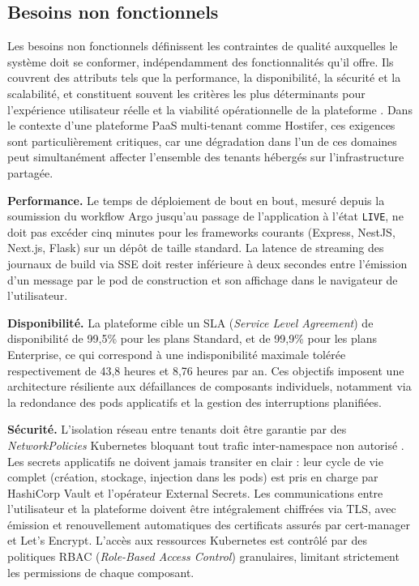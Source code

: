 \subsection{Besoins non fonctionnels}

Les besoins non fonctionnels définissent les contraintes de qualité auxquelles le système doit se conformer, indépendamment des fonctionnalités qu'il offre. Ils couvrent des attributs tels que la performance, la disponibilité, la sécurité et la scalabilité, et constituent souvent les critères les plus déterminants pour l'expérience utilisateur réelle et la viabilité opérationnelle de la plateforme \cite{sommerville-se}. Dans le contexte d'une plateforme PaaS multi-tenant comme Hostifer, ces exigences sont particulièrement critiques, car une dégradation dans l'un de ces domaines peut simultanément affecter l'ensemble des tenants hébergés sur l'infrastructure partagée.

\textbf{Performance.} Le temps de déploiement de bout en bout, mesuré depuis la soumission du workflow Argo jusqu'au passage de l'application à l'état \texttt{LIVE}, ne doit pas excéder cinq minutes pour les frameworks courants (Express, NestJS, Next.js, Flask) sur un dépôt de taille standard. La latence de streaming des journaux de build via SSE doit rester inférieure à deux secondes entre l'émission d'un message par le pod de construction et son affichage dans le navigateur de l'utilisateur.

\textbf{Disponibilité.} La plateforme cible un SLA (\textit{Service Level Agreement}) de disponibilité de 99,5\% pour les plans Standard, et de 99,9\% pour les plans Enterprise, ce qui correspond à une indisponibilité maximale tolérée respectivement de 43,8 heures et 8,76 heures par an. Ces objectifs imposent une architecture résiliente aux défaillances de composants individuels, notamment via la redondance des pods applicatifs et la gestion des interruptions planifiées.

\textbf{Sécurité.} L'isolation réseau entre tenants doit être garantie par des \textit{NetworkPolicies} Kubernetes bloquant tout trafic inter-namespace non autorisé \cite{multitenant-cloud}. Les secrets applicatifs ne doivent jamais transiter en clair : leur cycle de vie complet (création, stockage, injection dans les pods) est pris en charge par HashiCorp Vault et l'opérateur External Secrets. Les communications entre l'utilisateur et la plateforme doivent être intégralement chiffrées via TLS, avec émission et renouvellement automatiques des certificats assurés par cert-manager et Let's Encrypt. L'accès aux ressources Kubernetes est contrôlé par des politiques RBAC (\textit{Role-Based Access Control}) granulaires, limitant strictement les permissions de chaque composant.

